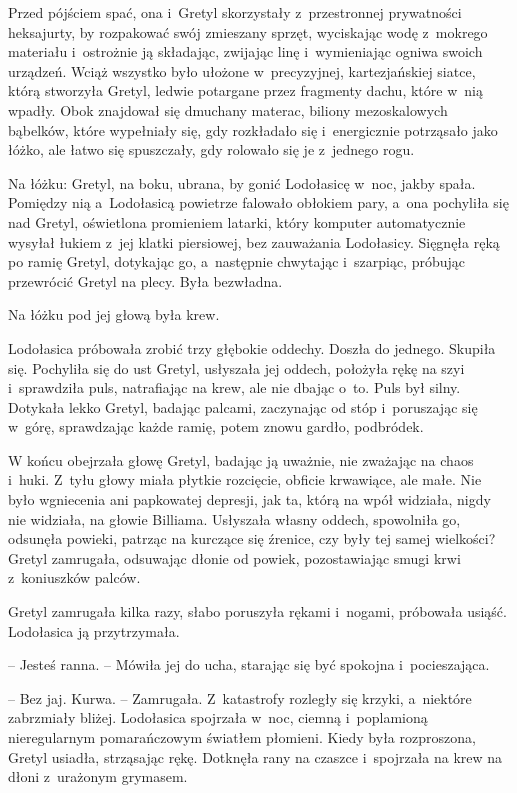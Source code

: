 \documentclass[oneside,polish,11pt,sfheadings]{mwbk}
\begin{document}
Przed pójściem spać, ona i~Gretyl skorzystały z~przestronnej prywatności
heksajurty, by rozpakować swój zmieszany sprzęt, wyciskając wodę z~mokrego materiału i~ostrożnie ją składając, zwijając linę i~wymieniając
ogniwa swoich urządzeń. Wciąż wszystko było ułożone w~precyzyjnej,
kartezjańskiej siatce, którą stworzyła Gretyl, ledwie potargane przez
fragmenty dachu, które w~nią wpadły. Obok znajdował się dmuchany
materac, biliony mezoskalowych bąbelków, które wypełniały się, gdy
rozkładało się i~energicznie potrząsało jako łóżko, ale łatwo się
spuszczały, gdy rolowało się je z~jednego rogu.

Na łóżku: Gretyl, na boku, ubrana, by gonić Lodołasicę w~noc, jakby
spała. Pomiędzy nią a~Lodołasicą powietrze falowało obłokiem pary, a~ona
pochyliła się nad Gretyl, oświetlona promieniem latarki, który komputer
automatycznie wysyłał łukiem z~jej klatki piersiowej, bez zauważania
Lodołasicy. Sięgnęła ręką po ramię Gretyl, dotykając go, a~następnie
chwytając i~szarpiąc, próbując przewrócić Gretyl na plecy. Była
bezwładna.

Na łóżku pod jej głową była krew.

Lodołasica próbowała zrobić trzy głębokie oddechy. Doszła do jednego.
Skupiła się. Pochyliła się do ust Gretyl, usłyszała jej oddech, położyła
rękę na szyi i~sprawdziła puls, natrafiając na krew, ale nie dbając o~to. Puls był silny. Dotykała lekko Gretyl, badając palcami, zaczynając
od stóp i~poruszając się w~górę, sprawdzając każde ramię, potem znowu
gardło, podbródek.

W końcu obejrzała głowę Gretyl, badając ją uważnie, nie zważając na
chaos i~huki. Z~tyłu głowy miała płytkie rozcięcie, obficie krwawiące,
ale małe. Nie było wgniecenia ani papkowatej depresji, jak ta, którą na
wpół widziała, nigdy nie widziała, na głowie Billiama. Usłyszała własny
oddech, spowolniła go, odsunęła powieki, patrząc na kurczące się
źrenice, czy były tej samej wielkości? Gretyl zamrugała, odsuwając
dłonie od powiek, pozostawiając smugi krwi z~koniuszków palców.

Gretyl zamrugała kilka razy, słabo poruszyła rękami i~nogami, próbowała
usiąść. Lodołasica ją przytrzymała. 

-- Jesteś ranna. -- Mówiła jej do
ucha, starając się być spokojna i~pocieszająca.

-- Bez jaj. Kurwa. -- Zamrugała. Z~katastrofy rozległy się krzyki, a~niektóre zabrzmiały bliżej. Lodołasica spojrzała w~noc, ciemną i~poplamioną nieregularnym pomarańczowym światłem płomieni. Kiedy była
rozproszona, Gretyl usiadła, strząsając rękę. Dotknęła rany na czaszce i~spojrzała na krew na dłoni z~urażonym grymasem. 
\end{document}

